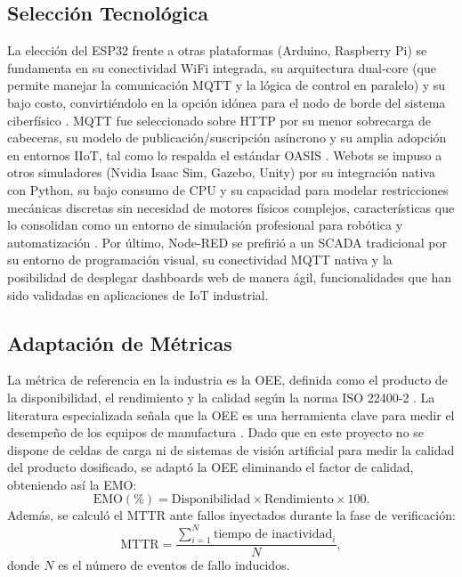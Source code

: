 \subsection{Selección Tecnológica}
La elección del ESP32 frente a otras plataformas (Arduino, Raspberry Pi) se fundamenta en su conectividad WiFi integrada, su arquitectura dual-core (que permite manejar la comunicación MQTT y la lógica de control en paralelo) y su bajo costo, convirtiéndolo en la opción idónea para el nodo de borde del sistema ciberfísico \cite{espressif2023}. MQTT fue seleccionado sobre HTTP por su menor sobrecarga de cabeceras, su modelo de publicación/suscripción asíncrono y su amplia adopción en entornos IIoT, tal como lo respalda el estándar OASIS \cite{oasis2014mqtt}. Webots se impuso a otros simuladores (Nvidia Isaac Sim, Gazebo, Unity) por su integración nativa con Python, su bajo consumo de CPU y su capacidad para modelar restricciones mecánicas discretas sin necesidad de motores físicos complejos, características que lo consolidan como un entorno de simulación profesional para robótica y automatización \cite{michel2004webots}. Por último, Node-RED se prefirió a un SCADA tradicional por su entorno de programación visual, su conectividad MQTT nativa y la posibilidad de desplegar dashboards web de manera ágil, funcionalidades que han sido validadas en aplicaciones de IoT industrial.

\subsection{Adaptación de Métricas}
La métrica de referencia en la industria es la OEE, definida como el producto de la disponibilidad, el rendimiento y la calidad según la norma ISO 22400-2 \cite{iso22400-2}. La literatura especializada señala que la OEE es una herramienta clave para medir el desempeño de los equipos de manufactura \cite{muchiri2008oee}. Dado que en este proyecto no se dispone de celdas de carga ni de sistemas de visión artificial para medir la calidad del producto dosificado, se adaptó la OEE eliminando el factor de calidad, obteniendo así la EMO:
\begin{equation}
    \text{EMO} (\%) = \text{Disponibilidad} \times \text{Rendimiento} \times 100.
\end{equation}
Además, se calculó el MTTR ante fallos inyectados durante la fase de verificación:
\begin{equation}
    \text{MTTR} = \frac{\sum_{i=1}^{N} \text{tiempo de inactividad}_i}{N},
\end{equation}
donde \(N\) es el número de eventos de fallo inducidos.

